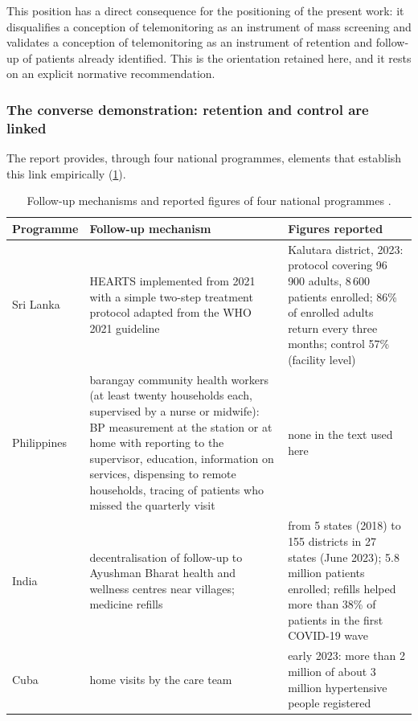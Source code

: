 \documentclass[12pt,a4paper,oneside]{report}
\begin{document}
This position has a direct consequence for the positioning of the present work: it disqualifies a conception of telemonitoring as an instrument of mass screening and validates a conception of telemonitoring as an instrument of retention and follow-up of patients already identified. This is the orientation retained here, and it rests on an explicit normative recommendation.

\subsubsection{The converse demonstration: retention and control are linked}

The report provides, through four national programmes, elements that establish this link empirically (\cref{tab:programmes}).

\begin{table}[htbp]
\centering\footnotesize
\caption{Follow-up mechanisms and reported figures of four national programmes \parencite{who2023hypertension}.}\label{tab:programmes}
\begin{tabularx}{\textwidth}{@{}>{\raggedright\arraybackslash}p{2.1cm} >{\raggedright\arraybackslash}X >{\raggedright\arraybackslash}X@{}}
\toprule
\textbf{Programme} & \textbf{Follow-up mechanism} & \textbf{Figures reported} \\
\midrule
Sri Lanka & HEARTS implemented from 2021 with a simple two-step treatment protocol adapted from the WHO 2021 guideline & Kalutara district, 2023: protocol covering 96\,900 adults, 8\,600 patients enrolled; 86\% of enrolled adults return every three months; control 57\% (facility level) \\
Philippines & barangay community health workers (at least twenty households each, supervised by a nurse or midwife): BP measurement at the station or at home with reporting to the supervisor, education, information on services, dispensing to remote households, tracing of patients who missed the quarterly visit & none in the text used here \\
India & decentralisation of follow-up to Ayushman Bharat health and wellness centres near villages; medicine refills & from 5 states (2018) to 155 districts in 27 states (June 2023); 5.8 million patients enrolled; refills helped more than 38\% of patients in the first COVID-19 wave \\
Cuba & home visits by the care team & early 2023: more than 2 million of about 3 million hypertensive people registered \\
\bottomrule
\end{tabularx}
\end{table}
\end{document}
